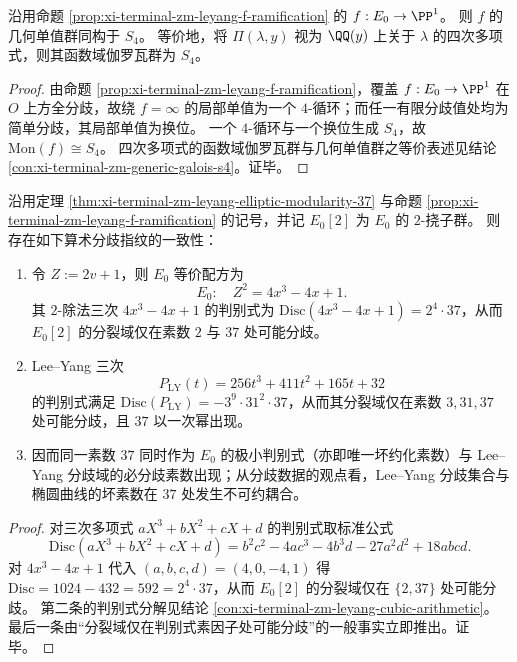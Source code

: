 \begin{theorem}[分歧型 \texorpdfstring{$(4;2^{5})$}{(4;2^5)} 覆盖的全对称单值化：\texorpdfstring{$\mathrm{Mon}(f)\cong S_4$}{Mon(f)=S4}]\label{thm:xi-terminal-zm-leyang-monodromy-s4}
沿用命题 \ref{prop:xi-terminal-zm-leyang-f-ramification} 的 \(f:E_0\to\PP^{1}\)。
则 \(f\) 的几何单值群同构于 \(S_4\)。
等价地，将 \(\Pi(\lambda,y)\) 视为 \(\QQ(y)\) 上关于 \(\lambda\) 的四次多项式，则其函数域伽罗瓦群为 \(S_4\)。
\end{theorem}
\begin{proof}
由命题 \ref{prop:xi-terminal-zm-leyang-f-ramification}，覆盖 \(f:E_0\to\PP^1\) 在 \(O\) 上方全分歧，故绕 \(f=\infty\) 的局部单值为一个 \(4\)-循环；而任一有限分歧值处均为简单分歧，其局部单值为换位。
一个 \(4\)-循环与一个换位生成 \(S_4\)，故 \(\mathrm{Mon}(f)\cong S_4\)。
四次多项式的函数域伽罗瓦群与几何单值群之等价表述见结论 \ref{con:xi-terminal-zm-generic-galois-s4}。证毕。
\end{proof}
\par

\begin{proposition}\label{prop:xi-terminal-37-double-ramification-fingerprint}
沿用定理 \ref{thm:xi-terminal-zm-leyang-elliptic-modularity-37} 与命题 \ref{prop:xi-terminal-zm-leyang-f-ramification} 的记号，并记 \(E_0[2]\) 为 \(E_0\) 的 \(2\)-挠子群。
则存在如下算术分歧指纹的一致性：
\begin{enumerate}
  \item 令 \(Z:=2v+1\)，则 \(E_0\) 等价配方为
  \[
  E_0:\quad Z^{2}=4x^{3}-4x+1.
  \]
  其 \(2\)-除法三次 \(4x^{3}-4x+1\) 的判别式为 \(\mathrm{Disc}(4x^{3}-4x+1)=2^{4}\cdot 37\)，从而 \(E_0[2]\) 的分裂域仅在素数 \(2\) 与 \(37\) 处可能分歧。
  \item Lee--Yang 三次
  \[
  P_{\mathrm{LY}}(t)=256t^{3}+411t^{2}+165t+32
  \]
  的判别式满足 \(\mathrm{Disc}(P_{\mathrm{LY}})=-3^{9}\cdot 31^{2}\cdot 37\)，从而其分裂域仅在素数 \(3,31,37\) 处可能分歧，且 \(37\) 以一次幂出现。
  \item 因而同一素数 \(37\) 同时作为 \(E_0\) 的极小判别式（亦即唯一坏约化素数）与 Lee--Yang 分歧域的必分歧素数出现；从分歧数据的观点看，Lee--Yang 分歧集合与椭圆曲线的坏素数在 \(37\) 处发生不可约耦合。
\end{enumerate}
\end{proposition}
\begin{proof}
对三次多项式 \(aX^{3}+bX^{2}+cX+d\) 的判别式取标准公式
\[
\mathrm{Disc}(aX^{3}+bX^{2}+cX+d)=b^{2}c^{2}-4ac^{3}-4b^{3}d-27a^{2}d^{2}+18abcd.
\]
对 \(4x^{3}-4x+1\) 代入 \((a,b,c,d)=(4,0,-4,1)\) 得 \(\mathrm{Disc}=1024-432=592=2^{4}\cdot 37\)，从而 \(E_0[2]\) 的分裂域仅在 \(\{2,37\}\) 处可能分歧。
第二条的判别式分解见结论 \ref{con:xi-terminal-zm-leyang-cubic-arithmetic}。
最后一条由“分裂域仅在判别式素因子处可能分歧”的一般事实立即推出。证毕。
\end{proof}
\par

